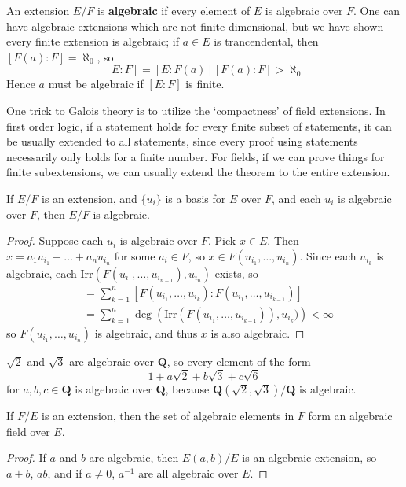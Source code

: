 An extension $E/F$ is {\bf algebraic} if every element of $E$ is algebraic over $F$. One can have algebraic extensions which are not finite dimensional, but we have shown every finite extension is algebraic; if $a \in E$ is trancendental, then $[F(a): F] = \aleph_0$, so
%
\[ [E:F] = [E:F(a)][F(a):F] > \aleph_0 \]
%
Hence $a$ must be algebraic if $[E:F]$ is finite.

One trick to Galois theory is to utilize the `compactness' of field extensions. In first order logic, if a statement holds for every finite subset of statements, it can be usually extended to all statements, since every proof using statements necessarily only holds for a finite number. For fields, if we can prove things for finite subextensions, we can usually extend the theorem to the entire extension.

\begin{theorem}
    If $E/F$ is an extension, and $\{ u_i \}$ is a basis for $E$ over $F$, and each $u_i$ is algebraic over $F$, then $E/F$ is algebraic.
\end{theorem}
\begin{proof}
    Suppose each $u_i$ is algebraic over $F$. Pick $x \in E$. Then $x = a_1 u_{i_1} + \dots + a_n u_{i_n}$ for some $a_i \in F$, so $x \in F(u_{i_1}, \dots, u_{i_n})$. Since each $u_{i_k}$ is algebraic, each $\text{Irr}(F(u_{i_1}, \dots, u_{i_{n-1}}), u_{i_n})$ exists, so
    \begin{align*}
        [F(u_{i_1}, \dots, u_{i_n}): F] &= \sum_{k = 1}^n \left[F(u_{i_1}, \dots, u_{i_k}): F(u_{i_1}, \dots, u_{i_{k-1}})\right]\\
        &= \sum_{k = 1}^n \deg\left(\text{Irr}\left(F(u_{i_1}, \dots, u_{i_{k-1}})\right), u_{i_k})\right) < \infty
    \end{align*}
    so $F(u_{i_1}, \dots, u_{i_n})$ is algebraic, and thus $x$ is also algebraic.
\end{proof}

\begin{example}
    $\sqrt{2}$ and $\sqrt{3}$ are algebraic over $\mathbf{Q}$, so every element of the form
    \[ 1 + a \sqrt{2} + b \sqrt{3} + c \sqrt{6} \]
    for $a,b,c \in \mathbf{Q}$ is algebraic over $\mathbf{Q}$, because $\mathbf{Q}(\sqrt{2},\sqrt{3})/\mathbf{Q}$ is algebraic.
\end{example}

\begin{theorem}
    If $F/E$ is an extension, then the set of algebraic elements in $F$ form an algebraic field over $E$.
\end{theorem}
\begin{proof}
    If $a$ and $b$ are algebraic, then $E(a,b)/E$ is an algebraic extension, so $a + b$, $ab$, and if $a \neq 0$, $a^{-1}$ are all algebraic over $E$.
\end{proof}


